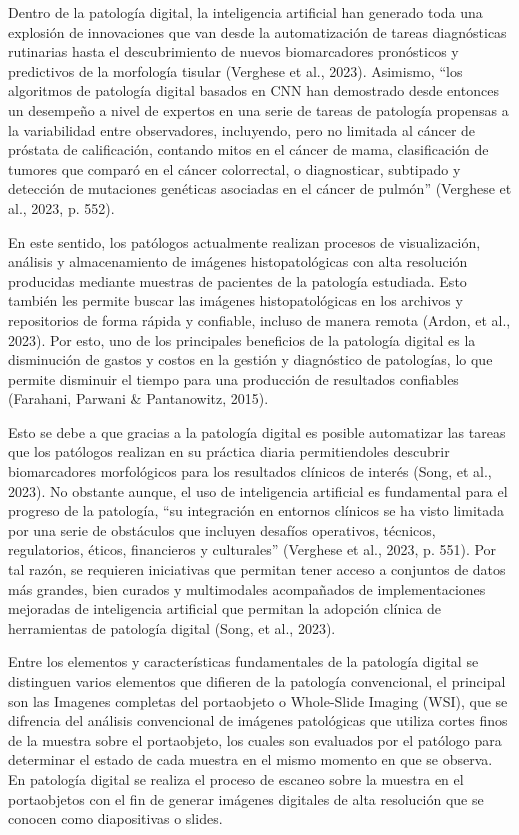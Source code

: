 \documentclass[12pt,letterpaper,final, openany]{scrbook}
\begin{document}
Dentro de la patología digital, la inteligencia artificial han generado toda una explosión de innovaciones que van desde la automatización de tareas diagnósticas rutinarias hasta el descubrimiento de nuevos biomarcadores pronósticos y predictivos de la morfología tisular (Verghese et al., 2023). Asimismo, ``los algoritmos de patología digital basados en CNN han demostrado desde entonces un desempeño a nivel de expertos en una serie de tareas de patología propensas a la variabilidad entre observadores, incluyendo, pero no limitada al cáncer de próstata de calificación, contando mitos en el cáncer de mama, clasificación de tumores que comparó en el cáncer colorrectal, o diagnosticar, subtipado y detección de mutaciones genéticas asociadas en el cáncer de pulmón” (Verghese et al., 2023, p. 552).

En este sentido, los patólogos actualmente realizan procesos de visualización, análisis y almacenamiento de imágenes histopatológicas con alta resolución producidas mediante muestras de pacientes de la patología estudiada. Esto también les permite buscar las imágenes histopatológicas en los archivos y repositorios de forma rápida y confiable, incluso de manera remota (Ardon, et al., 2023). Por esto, uno de los principales beneficios de la patología digital es la disminución de gastos y costos en la gestión y diagnóstico de patologías, lo que permite disminuir el tiempo para una producción de resultados confiables (Farahani, Parwani \& Pantanowitz, 2015).

Esto se debe a que gracias a la patología digital es posible automatizar las tareas que los patólogos realizan en su práctica diaria permitiendoles descubrir biomarcadores morfológicos para los resultados clínicos de interés (Song, et al., 2023). No obstante aunque, el uso de inteligencia artificial es fundamental para el progreso de la patología, “su integración en entornos clínicos se ha visto limitada por una serie de obstáculos que incluyen desafíos operativos, técnicos, regulatorios, éticos, financieros y culturales” (Verghese et al., 2023, p. 551). Por tal razón, se requieren iniciativas que permitan tener acceso a conjuntos de datos más grandes, bien curados y multimodales acompañados de implementaciones mejoradas de inteligencia artificial que permitan la adopción clínica de herramientas de patología digital (Song, et al., 2023).

Entre los elementos y características fundamentales de la patología digital se distinguen varios elementos que difieren de la patología convencional, el principal son las Imagenes completas del portaobjeto o Whole-Slide Imaging (WSI), que se difrencia del análisis convencional de imágenes patológicas que utiliza cortes finos de la muestra sobre el portaobjeto, los cuales son evaluados por el patólogo para determinar el estado de cada muestra en el mismo momento en que se observa. En patología digital se realiza el proceso de escaneo sobre la muestra en el portaobjetos con el fin de generar imágenes digitales de alta resolución que se conocen como diapositivas o slides.
\end{document}
